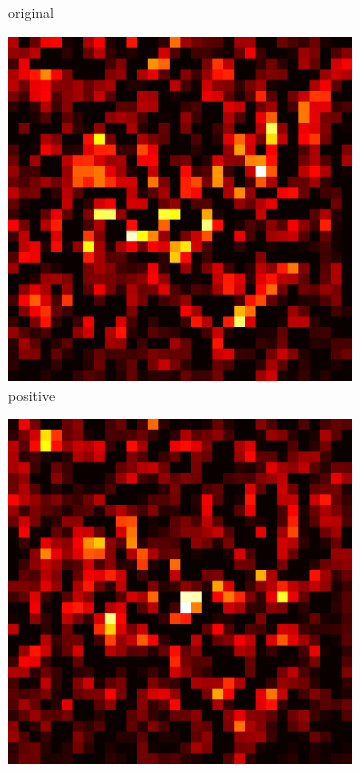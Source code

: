 \documentclass[preprint,12pt]{elsarticle}
\begin{document}
\begin{figure}
\begin{subfigure}{0.14\linewidth}
        \caption{original}
    \end{subfigure}
    \hfill
    \begin{subfigure}{0.14\textwidth}
        \centering
        \includegraphics[width=\linewidth]{../visualizations/examples/cifar10/resnet18/positive_saliency_map/0.png}
        \caption{positive}
    \end{subfigure}
    \hfill
    \begin{subfigure}{0.14\textwidth}
        \centering
        \includegraphics[width=\linewidth]{../visualizations/examples/cifar10/resnet18/negative_saliency_map/0.png}

\end{subfigure}
\end{figure}
\end{document}
